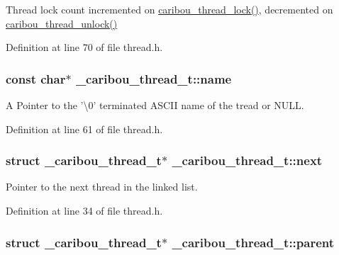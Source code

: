 Thread lock count incremented on \hyperlink{thread_8h_a81ec8b7e5f2accca0c462337830fbdf5}{caribou\-\_\-thread\-\_\-lock()}, decremented on \hyperlink{thread_8h_a0b4d0cd341028e7713f6f0f60a018529}{caribou\-\_\-thread\-\_\-unlock()} 



Definition at line 70 of file thread.\-h.

\hypertarget{struct__caribou__thread__t_af6982a95fce8e2c99023a803d903707b}{
\subsubsection[{name}]{\setlength{\rightskip}{0pt plus 5cm}const char$\ast$ \-\_\-caribou\-\_\-thread\-\_\-t\-::name}}\label{struct__caribou__thread__t_af6982a95fce8e2c99023a803d903707b}


A Pointer to the '\textbackslash{}0' terminated A\-S\-C\-I\-I name of the tread or N\-U\-L\-L. 



Definition at line 61 of file thread.\-h.

\hypertarget{struct__caribou__thread__t_a584ef536a58df0aa0e097add451a66e4}{
\subsubsection[{next}]{\setlength{\rightskip}{0pt plus 5cm}struct {\bf \-\_\-caribou\-\_\-thread\-\_\-t}$\ast$ \-\_\-caribou\-\_\-thread\-\_\-t\-::next}}\label{struct__caribou__thread__t_a584ef536a58df0aa0e097add451a66e4}


Pointer to the next thread in the linked list. 



Definition at line 34 of file thread.\-h.

\hypertarget{struct__caribou__thread__t_a1ecb216e2a946081e642ad98bbbbd9e7}{
\subsubsection[{parent}]{\setlength{\rightskip}{0pt plus 5cm}struct {\bf \-\_\-caribou\-\_\-thread\-\_\-t}$\ast$ \-\_\-caribou\-\_\-thread\-\_\-t\-::parent}}\label{struct__caribou__thread__t_a1ecb216e2a946081e642ad98bbbbd9e7}


